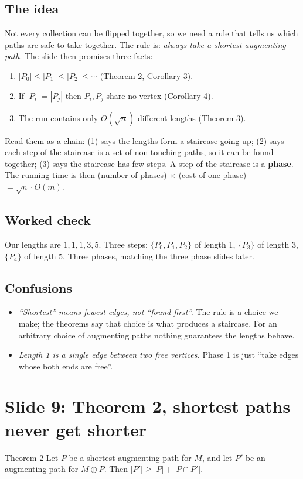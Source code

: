 \documentclass[11pt,a4paper]{article}
\begin{document}
\subsection*{The idea}
Not every collection can be flipped together, so we need a rule that tells us which paths are safe to take together. The rule is: \emph{always take a shortest augmenting path}. The slide then promises three facts:
\begin{enumerate}
  \item $|P_0|\le|P_1|\le|P_2|\le\cdots$ (Theorem 2, Corollary 3).
  \item If $|P_i|=|P_j|$ then $P_i,P_j$ share no vertex (Corollary 4).
  \item The run contains only $O(\sqrt n)$ different lengths (Theorem 3).
\end{enumerate}
Read them as a chain: (1) says the lengths form a staircase going up; (2) says each step of the staircase is a set of non-touching paths, so it can be found together; (3) says the staircase has few steps. A step of the staircase is a \textbf{phase}. The running time is then (number of phases) $\times$ (cost of one phase) $=\sqrt n\cdot O(m)$.

\subsection*{Worked check}
Our lengths are $1,1,1,3,5$. Three steps: $\{P_0,P_1,P_2\}$ of length 1, $\{P_3\}$ of length 3, $\{P_4\}$ of length 5. Three phases, matching the three phase slides later.

\subsection*{Confusions}
\begin{itemize}
  \item \emph{``Shortest'' means fewest edges, not ``found first''.} The rule is a choice we make; the theorems say that choice is what produces a staircase. For an arbitrary choice of augmenting paths nothing guarantees the lengths behave.
  \item \emph{Length 1 is a single edge between two free vertices.} Phase 1 is just ``take edges whose both ends are free''.
\end{itemize}

\section{Slide 9: Theorem 2, shortest paths never get shorter}
\begin{thm}{Theorem 2}
Let $P$ be a shortest augmenting path for $M$, and let $P'$ be an augmenting path for $M\oplus P$. Then $|P'|\ge|P|+|P\cap P'|$.
\end{thm}
\end{document}
